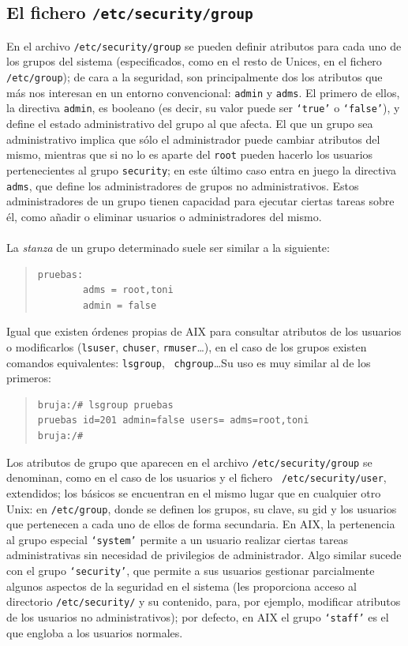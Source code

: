 \subsection{El fichero {\tt /etc/security/group}}
En el archivo {\tt /etc/security/group} se pueden definir atributos para cada
uno de los grupos del sistema (especificados, como en el resto de Unices, en
el fichero {\tt /etc/group}); de cara a la seguridad, son principalmente dos
los atributos que m\'as nos interesan en un entorno convencional: {\tt admin} y
{\tt adms}. El primero de ellos, la directiva {\tt admin}, es booleano (es 
decir, su valor puede ser {\tt `true'} o {\tt `false'}), y define el estado 
administrativo del grupo al que afecta. El que un grupo sea administrativo 
implica que s\'olo el administrador puede cambiar atributos del mismo, mientras
que si no lo es aparte del {\tt root} pueden hacerlo los usuarios pertenecientes
al grupo {\tt security}; en este \'ultimo caso entra en juego la directiva {\tt
adms}, que define los administradores de grupos no administrativos. Estos 
administradores de un grupo tienen capacidad para ejecutar ciertas tareas sobre 
\'el, como a\~nadir o eliminar usuarios o administradores del mismo.\\
\\La {\it stanza} de un grupo determinado suele ser similar a la siguiente:
\begin{quote}
\begin{verbatim}
pruebas:
        adms = root,toni
        admin = false
\end{verbatim}
\end{quote}
Igual que existen \'ordenes propias de AIX para consultar atributos de los 
usuarios o modificarlos ({\tt lsuser}, {\tt chuser}, {\tt rmuser}\ldots), en el 
caso de los grupos existen comandos equivalentes: {\tt lsgroup}, {\tt 
chgroup}\ldots Su uso es muy similar al de los primeros:
\begin{quote}
\begin{verbatim}
bruja:/# lsgroup pruebas
pruebas id=201 admin=false users= adms=root,toni
bruja:/# 
\end{verbatim}
\end{quote}
Los atributos de grupo que aparecen en el archivo {\tt /etc/security/group} se
denominan, como en el caso de los usuarios y el fichero {\tt 
/etc/security/user}, extendidos; los b\'asicos se encuentran en el mismo lugar 
que en cualquier otro Unix: en
{\tt /etc/group}, donde se definen los grupos, su clave, su {\sc gid} y los
usuarios que pertenecen a cada uno de ellos de forma secundaria. En AIX, la
pertenencia al grupo especial {\tt `system'} permite a un usuario realizar
ciertas tareas administrativas sin necesidad de privilegios de administrador.
Algo similar sucede con el grupo {\tt `security'}, que permite a sus usuarios
gestionar parcialmente algunos aspectos de la seguridad en el sistema (les 
proporciona acceso al directorio {\tt /etc/security/} y su contenido, para, por 
ejemplo, modificar atributos de los usuarios no administrativos); por defecto, 
en AIX el grupo {\tt `staff'} es el que engloba a los usuarios normales.
